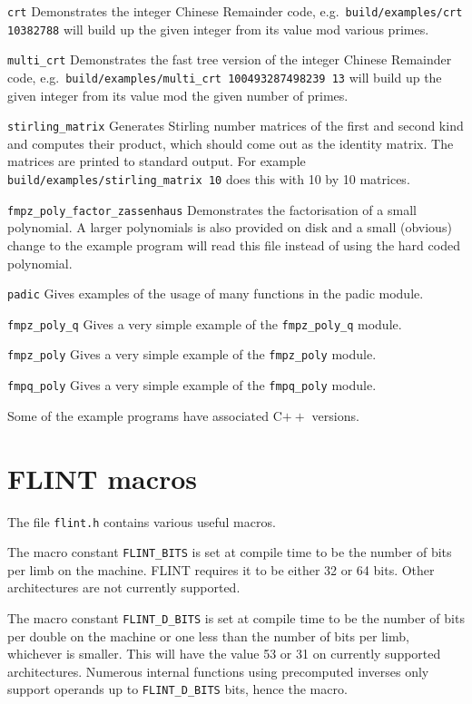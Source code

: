 \documentclass[a4paper,10pt]{book}
\newcommand{\code}{\lstinline}
\begin{document}
\code{crt}  Demonstrates the integer Chinese Remainder code, e.g.\
\code{build/examples/crt 10382788} will build up the given integer from
its value mod various primes.

\code{multi_crt}  Demonstrates the fast tree version of the integer Chinese
Remainder code, e.g.\
\code{build/examples/multi_crt 100493287498239 13} will build up the given
integer from its value mod the given number of primes.

\code{stirling_matrix}  Generates Stirling number matrices of the first
and second kind and computes their product, which should come out as the
identity matrix. The matrices are printed to standard output.
For example \code{build/examples/stirling_matrix 10} does this
with 10 by 10 matrices.

\code{fmpz_poly_factor_zassenhaus} Demonstrates the factorisation of a
small polynomial. A larger polynomials is also provided on disk and a
small (obvious) change to the example program will read this file instead
of using the hard coded polynomial.

\code{padic} Gives examples of the usage of many functions in the padic
module.

\code{fmpz_poly_q} Gives a very simple example of the \code{fmpz_poly_q}
module.

\code{fmpz_poly} Gives a very simple example of the \code{fmpz_poly}
module.

\code{fmpq_poly} Gives a very simple example of the \code{fmpq_poly}
module.

Some of the example programs have associated C$++$ versions.

\chapter{FLINT macros}

The file \code{flint.h} contains various useful macros.

The macro constant \code{FLINT_BITS} is set at compile time to be the
number of bits per limb on the machine.  FLINT requires it to be either
32 or 64 bits.  Other architectures are not currently supported.

The macro constant \code{FLINT_D_BITS} is set at compile time to be the
number of bits per double on the machine or one less than the number of
bits per limb, whichever is smaller.  This will have the value 53 or 31
on currently supported architectures.  Numerous internal functions using
precomputed inverses only support operands up to \code{FLINT_D_BITS} bits,
hence the macro.
\end{document}

